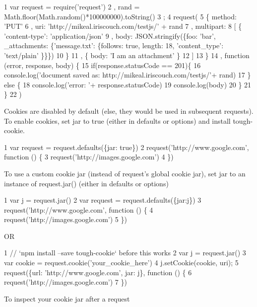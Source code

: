 \begin{DoxyCode}
1 var request = require('request')
2   , rand = Math.floor(Math.random()*100000000).toString()
3   ;
4 request(
5   \{ method: 'PUT'
6   , uri: 'http://mikeal.iriscouch.com/testjs/' + rand
7   , multipart:
8     [ \{ 'content-type': 'application/json'
9       ,  body: JSON.stringify(\{foo: 'bar', \_attachments: \{'message.txt': \{follows: true, length: 18,
       'content\_type': 'text/plain' \}\}\})
10       \}
11     , \{ body: 'I am an attachment' \}
12     ]
13   \}
14 , function (error, response, body) \{
15     if(response.statusCode == 201)\{
16       console.log('document saved as: http://mikeal.iriscouch.com/testjs/'+ rand)
17     \} else \{
18       console.log('error: '+ response.statusCode)
19       console.log(body)
20     \}
21   \}
22 )
\end{DoxyCode}


Cookies are disabled by default (else, they would be used in subsequent requests). To enable cookies, set {\ttfamily jar} to {\ttfamily true} (either in {\ttfamily defaults} or {\ttfamily options}) and install {\ttfamily tough-\/cookie}.


\begin{DoxyCode}
1 var request = request.defaults(\{jar: true\})
2 request('http://www.google.com', function () \{
3   request('http://images.google.com')
4 \})
\end{DoxyCode}


To use a custom cookie jar (instead of {\ttfamily request}’s global cookie jar), set {\ttfamily jar} to an instance of {\ttfamily request.\+jar()} (either in {\ttfamily defaults} or {\ttfamily options})


\begin{DoxyCode}
1 var j = request.jar()
2 var request = request.defaults(\{jar:j\})
3 request('http://www.google.com', function () \{
4   request('http://images.google.com')
5 \})
\end{DoxyCode}


O\+R


\begin{DoxyCode}
1 // `npm install --save tough-cookie` before this works
2 var j = request.jar()
3 var cookie = request.cookie('your\_cookie\_here')
4 j.setCookie(cookie, uri);
5 request(\{url: 'http://www.google.com', jar: j\}, function () \{
6   request('http://images.google.com')
7 \})
\end{DoxyCode}


To inspect your cookie jar after a request



